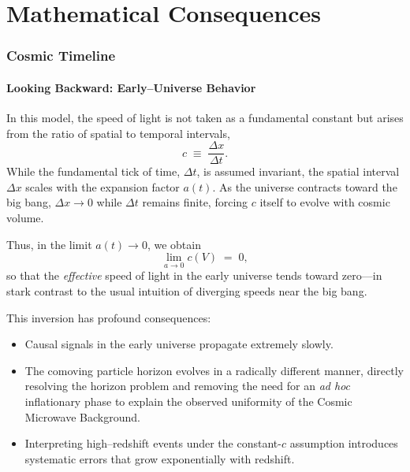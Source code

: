 \documentclass[12pt]{article}
\begin{document}
\cleardoublepage
\part{Mathematical Consequences}

\section{Cosmic Timeline}

\subsection{Looking Backward: Early–Universe Behavior}

In this model, the speed of light is not taken as a fundamental constant but arises from the ratio of spatial to temporal intervals,
\begin{equation}
c \;\equiv\; \frac{\Delta x}{\Delta t}.
\end{equation}
While the fundamental tick of time, $\Delta t$, is assumed invariant, the spatial interval $\Delta x$ scales with the expansion factor $a(t)$. 
As the universe contracts toward the big bang, $\Delta x \to 0$ while $\Delta t$ remains finite, forcing $c$ itself to evolve with cosmic volume. 

Thus, in the limit $a(t) \to 0$, we obtain
\begin{equation}
\lim_{a\to 0} c(V) \;=\; 0,
\end{equation}
so that the \emph{effective} speed of light in the early universe tends toward zero---in stark contrast to the usual intuition of diverging speeds near the big bang.

This inversion has profound consequences:
\begin{itemize}
\item Causal signals in the early universe propagate extremely slowly.  
\item The comoving particle horizon evolves in a radically different manner, directly resolving the horizon problem and removing the need for an \emph{ad hoc} inflationary phase to explain the observed uniformity of the Cosmic Microwave Background.  
\item Interpreting high--redshift events under the constant-$c$ assumption introduces systematic errors that grow exponentially with redshift.  
\end{itemize}
\end{document}
